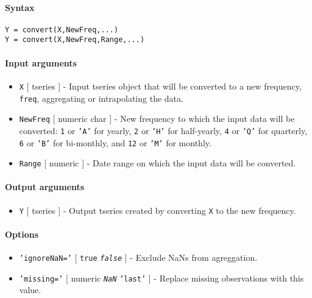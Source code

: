 


	\paragraph{Syntax}

\begin{verbatim}
Y = convert(X,NewFreq,...)
Y = convert(X,NewFreq,Range,...)
\end{verbatim}

\paragraph{Input arguments}

\begin{itemize}
\item
  \texttt{X} {[} tseries {]} - Input tseries object that will be
  converted to a new frequency, \texttt{freq}, aggregating or
  intrapolating the data.
\item
  \texttt{NewFreq} {[} numeric \textbar{} char {]} - New frequency to
  which the input data will be converted: \texttt{1} or \texttt{'A'} for
  yearly, \texttt{2} or \texttt{'H'} for half-yearly, \texttt{4} or
  \texttt{'Q'} for quarterly, \texttt{6} or \texttt{'B'} for bi-monthly,
  and \texttt{12} or \texttt{'M'} for monthly.
\item
  \texttt{Range} {[} numeric {]} - Date range on which the input data
  will be converted.
\end{itemize}

\paragraph{Output arguments}

\begin{itemize}
\itemsep1pt\parskip0pt
\item
  \texttt{Y} {[} tseries {]} - Output tseries created by converting
  \texttt{X} to the new frequency.
\end{itemize}

\paragraph{Options}

\begin{itemize}
\item
  \texttt{'ignoreNaN='} {[} \texttt{true} \textbar{}
  \emph{\texttt{false}} {]} - Exclude NaNs from agreggation.
\item
  \texttt{'missing='} {[} numeric \textbar{} \emph{\texttt{NaN}}
  \textbar{} \texttt{'last'} {]} - Replace missing observations with
  this value.
\end{itemize}

